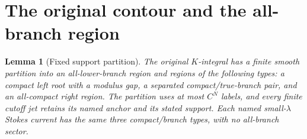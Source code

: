 \documentclass[11pt]{article}
\numberwithin{equation}{section}
\newtheorem{lemma}[theorem]{Lemma}
\theoremstyle{definition}
\begin{document}
\section{The original contour and the all-branch region}
\label{sec:K}
\begin{lemma}[Fixed support partition]\label{lem:partition}
The original \(K\)-integral has a finite smooth partition into an
all-lower-branch region and regions of the following types: a compact
left root with a modulus gap, a separated compact/true-branch pair,
and an all-compact right region. The partition uses at most \(C^N\)
labels, and every finite cutoff jet retains its named anchor and its
stated support.
Each named small-\(\lambda\) Stokes current has the same three
compact/branch types, with no all-branch sector.
\end{lemma}
\end{document}
